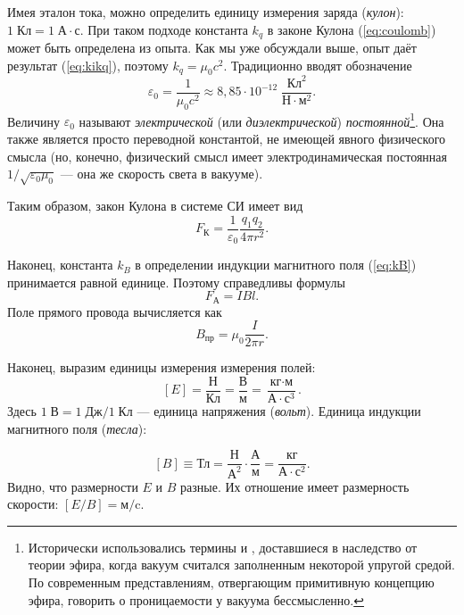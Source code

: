 Имея эталон тока, можно определить единицу измерения заряда (\emph{кулон}):
$1\;\text{Кл}=1\;\text{А}\cdot\text{с}$. При таком подходе константа
$k_{q}$ в законе Кулона (\ref{eq:coulomb}) может быть определена
из опыта. Как мы уже обсуждали выше, опыт даёт результат (\ref{eq:kikq}),
поэтому $k_{q}=\mu_{0}c^{2}$. Традиционно вводят обозначение 
\begin{equation}
\varepsilon_{0}=\frac{1}{\mu_{0}c^{2}}\approx8{,}85\cdot10^{-12}\;\frac{\text{Кл}^{2}}{\text{Н}\cdot\text{м}^{2}}.
\end{equation}
Величину $\varepsilon_{0}$ называют \emph{электрической }(или\emph{
диэлектрической})\emph{ постоянной}\footnote{Исторически использовались термины  и  , доставшиеся в наследство от теории эфира,
когда вакуум считался заполненным некоторой упругой средой. По современным
представлениям, отвергающим примитивную концепцию эфира, говорить
о проницаемости у вакуума бессмысленно.}. Она также является просто переводной константой, не имеющей
явного физического смысла (но, конечно, физический смысл имеет электродинамическая
постоянная $1/\sqrt{\varepsilon_{0}\mu_{0}}$ --- она же скорость
света в вакууме).

Таким образом, закон Кулона в системе СИ имеет вид
\begin{equation}
F_{\text{К}}=\frac{1}{\varepsilon_{0}}\frac{q_{1}q_{2}}{4\pi r^{2}}.
\end{equation}

Наконец, константа $k_{B}$ в определении индукции магнитного поля
(\ref{eq:kB}) принимается равной единице. Поэтому справедливы формулы
\begin{equation}
F_{\text{А}}=IBl.
\end{equation}
Поле прямого провода вычисляется как 
\[
B_{\text{пр}}=\mu_{0}\dfrac{I}{2\pi r}.
\]

Наконец, выразим единицы измерения измерения полей:
\[
\left[E\right]=\frac{\text{Н}}{\text{Кл}}=\frac{\text{В}}{\text{м}}=\frac{\text{кг}\cdot\text{м}}{\text{А}\cdot\text{с}^{3}}.
\]
Здесь $1\;\text{В}=1\;\text{Дж}/1\;\text{Кл}$ --- единица напряжения
(\emph{вольт}). Единица индукции магнитного поля (\emph{тесла}):

\[
\left[B\right]\equiv\text{Тл}=\frac{\text{Н}}{\text{А}^{2}}\cdot\frac{\text{А}}{\text{м}}=\frac{\text{кг}}{\text{А}\cdot\text{с}^{2}}.
\]
Видно, что размерности $E$ и $B$ разные. Их отношение имеет размерность
скорости: $\left[E/B\right]=\text{м/c}$.


